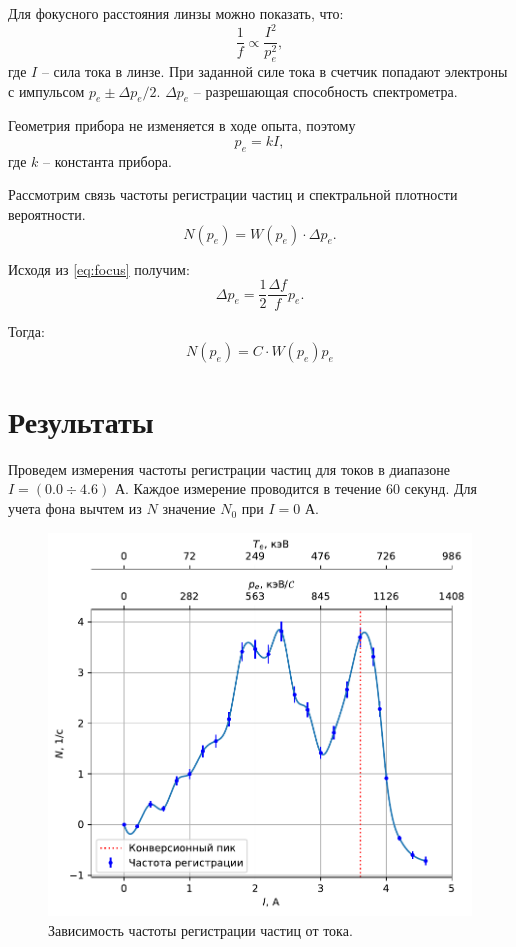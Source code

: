 \documentclass[a4paper, 12pt]{article} %
\begin{document}
	Для фокусного расстояния линзы можно показать, что:
	\begin{equation}
		\frac{1}{f} \propto \frac{I^2}{p_e^2},
		\label{eq:focus}
	\end{equation}
	где $I$ -- сила тока в линзе. При заданной силе тока в счетчик попадают электроны с импульсом $p_e \pm \Delta p_e / 2$. $\Delta p_e$ -- разрешающая способность спектрометра.
	
	Геометрия прибора не изменяется в ходе опыта, поэтому
	\begin{equation}
		p_e = kI,
	\end{equation}
	где $k$ -- константа прибора.
	
	Рассмотрим связь частоты регистрации частиц и спектральной плотности вероятности.
	$$N(p_e) = W(p_e) \cdot \Delta p_e.$$
	
	Исходя из \eqref{eq:focus} получим:
	$$ \Delta p_e = \frac{1}{2} \frac{\Delta f}{f} 	p_e.$$
	
	Тогда:
	\begin{equation}
		N(p_e) = C \cdot W(p_e) p_e
		\label{eq:fermi}
	\end{equation}
	
	\section{Результаты}
	
	Проведем измерения частоты регистрации частиц для токов в диапазоне $I = (0.0 \div 4.6)$ А. Каждое измерение проводится в течение 60 секунд. Для учета фона вычтем из $N$ значение $N_0$ при $I = 0$ А.
	
	\begin{figure}[h!]
		\centering
		\includegraphics[width=0.8\linewidth]{gen/spectrum.pdf}
		\caption{Зависимость частоты регистрации частиц от тока.}
		\label{fig:exp_spectrum}
	\end{figure}
\end{document}
